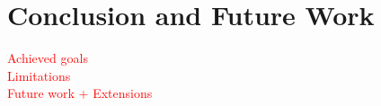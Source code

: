 
\chapter{Conclusion and Future Work} %

\label{chap:Chapter7} %

\textcolor{red}
{
	Achieved goals\\
	Limitations\\
	Future work + Extensions
}
